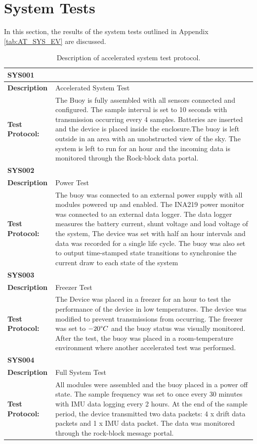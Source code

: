 \section{System Tests}
\label{sec:ch4_systests}
In this section, the results of the system tests outlined in Appendix \ref{tab:AT_SYS_EV} are discussed.
\begin{table}[H]
	\centering
	\caption{Description of accelerated system test protocol.}
	\begin{tabular}{|m{}|m{}|}
		\multicolumn{2}{l}{\textbf{SYS001} }\\
		\hline
		\textbf{Description} & Accelerated System Test\\
		\hline
		\textbf{Test Protocol:} &  The Buoy is fully assembled with all sensors connected and configured. The sample interval is set to 10 seconds with transmission occurring every 4 samples. Batteries are inserted and the device is placed inside the enclosure.The buoy is left outside in an area with an unobstructed view of the sky. The system is left to run for an hour and the incoming data is monitored through the Rock-block data portal.\\
		\hline
		\multicolumn{2}{l}{\textbf{SYS002} }\\
		\hline
		\textbf{Description} &  Power Test\\
		\hline
		\textbf{Test Protocol:} & The buoy was connected to an external power supply with all modules powered up and enabled. The INA219 power monitor was connected to an external data logger. The data logger measures the battery current, shunt voltage and load voltage of the system, The device was set with half an hour intervals and data was recorded for a single life cycle. The buoy was also set to output time-stamped state transitions to synchronise the current draw to each state of the system\\
		\hline
		\multicolumn{2}{l}{\textbf{SYS003} }\\
		\hline
		\textbf{Description} &  Freezer Test\\
		\hline
		\textbf{Test Protocol:} &  The Device was placed in a freezer for an hour to test the performance of the device in low temperatures. The device was modified to prevent transmissions from occurring. The freezer was set to $-20\degree C$  and the buoy status was visually monitored. After the test, the buoy was placed in a room-temperature environment where another accelerated test was performed.\\
		\hline
		\multicolumn{2}{l}{\textbf{SYS004} }\\
		\hline
		\textbf{Description} &  Full System Test\\
		\hline
		\textbf{Test Protocol:} &  All modules were assembled and the buoy placed in a power off state. The sample frequency was set to once every 30 minutes with IMU data logging every 2 hours. At the end of the sample period, the device transmitted two data packets: 4 x drift data packets and 1 x IMU data packet. The data was monitored through the rock-block message portal. \\
		\hline
		

\end{tabular}
\end{table}
